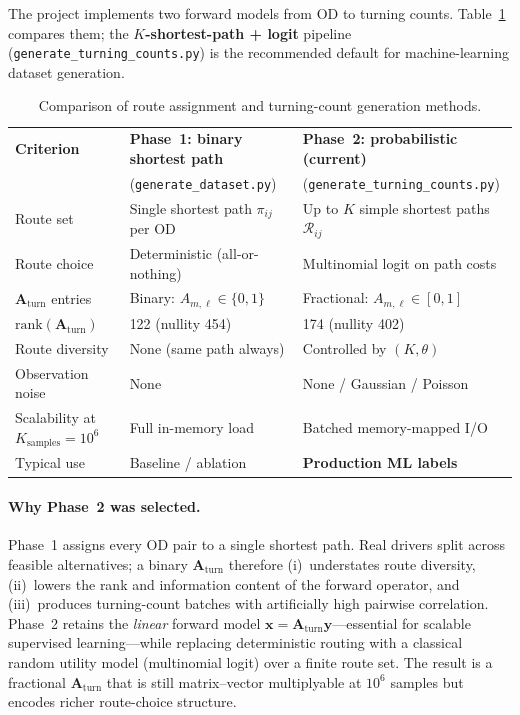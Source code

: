 \documentclass[11pt,a4paper]{report}
\newcommand{\mathbfy}{\mathbf{y}}
\newcommand{\mathbfx}{\mathbf{x}}
\newcommand{\Aturn}{\mathbf{A}_{\mathrm{turn}}}
\begin{document}
The project implements two forward models from OD to turning counts. Table~\ref{tab:route_gen_compare} compares them; the \textbf{$K$-shortest-path + logit} pipeline (\texttt{generate\_turning\_counts.py}) is the recommended default for machine-learning dataset generation.

\begin{table}[ht]
\centering
\caption{Comparison of route assignment and turning-count generation methods.}
\label{tab:route_gen_compare}
\small
\begin{tabular}{@{}p{3.2cm}p{4.8cm}p{4.8cm}@{}}
\toprule
\textbf{Criterion} & \textbf{Phase~1: binary shortest path} & \textbf{Phase~2: probabilistic (current)} \\
 & (\texttt{generate\_dataset.py}) & (\texttt{generate\_turning\_counts.py}) \\
\midrule
Route set &
Single shortest path $\pi_{ij}$ per OD &
Up to $K$ simple shortest paths $\mathcal{R}_{ij}$ \\
Route choice &
Deterministic (all-or-nothing) &
Multinomial logit on path costs \\
$\Aturn$ entries &
Binary: $A_{m,\ell}\in\{0,1\}$ &
Fractional: $A_{m,\ell}\in[0,1]$ \\
$\mathrm{rank}(\Aturn)$ &
122 (nullity 454) &
174 (nullity 402) \\
Route diversity &
None (same path always) &
Controlled by $(K,\theta)$ \\
Observation noise &
None &
None / Gaussian / Poisson \\
Scalability at $K_{\mathrm{samples}}=10^6$ &
Full in-memory load &
Batched memory-mapped I/O \\
Typical use &
Baseline / ablation &
\textbf{Production ML labels} \\
\bottomrule
\end{tabular}
\end{table}

\paragraph{Why Phase~2 was selected.}
Phase~1 assigns every OD pair to a single shortest path. Real drivers split across feasible alternatives; a binary $\Aturn$ therefore (i)~understates route diversity, (ii)~lowers the rank and information content of the forward operator, and (iii)~produces turning-count batches with artificially high pairwise correlation. Phase~2 retains the \emph{linear} forward model $\mathbfx=\Aturn\mathbfy$---essential for scalable supervised learning---while replacing deterministic routing with a classical random utility model (multinomial logit) over a finite route set. The result is a fractional $\Aturn$ that is still matrix--vector multiplyable at $10^6$ samples but encodes richer route-choice structure.
\end{document}
